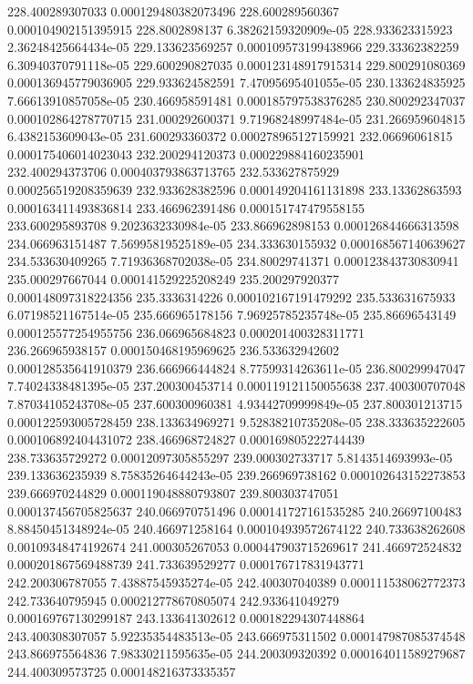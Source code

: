 {228.400289307033 0.000129480382073496
228.600289560367 0.000104902151395915
228.8002898137 6.38262159320909e-05
228.933623315923 2.36248425664434e-05
229.133623569257 0.000109573199438966
229.33362382259 6.30940370791118e-05
229.600290827035 0.000123148917915314
229.800291080369 0.000136945779036905
229.933624582591 7.47095695401055e-05
230.133624835925 7.66613910857058e-05
230.466958591481 0.000185797538376285
230.800292347037 0.000102864278770715
231.000292600371 9.71968248997484e-05
231.266959604815 6.4382153609043e-05
231.600293360372 0.000278965127159921
232.06696061815 0.000175406014023043
232.200294120373 0.000229884160235901
232.400294373706 0.000403793863713765
232.533627875929 0.000256519208359639
232.933628382596 0.000149204161131898
233.13362863593 0.000163411493836814
233.466962391486 0.000151747479558155
233.600295893708 9.2023632330984e-05
233.866962898153 0.000126844666313598
234.066963151487 7.56995819525189e-05
234.333630155932 0.000168567140639627
234.533630409265 7.71936368702038e-05
234.80029741371 0.000123843730830941
235.000297667044 0.000141529225208249
235.200297920377 0.000148097318224356
235.3336314226 0.000102167191479292
235.533631675933 6.07198521167514e-05
235.666965178156 7.96925785235748e-05
235.86696543149 0.000125577254955756
236.066965684823 0.000201400328311771
236.266965938157 0.000150468195969625
236.533632942602 0.000128535641910379
236.666966444824 8.77599314263611e-05
236.800299947047 7.74024338481395e-05
237.200300453714 0.000119121150055638
237.400300707048 7.87034105243708e-05
237.600300960381 4.93442709999849e-05
237.800301213715 0.000122593005728459
238.133634969271 9.52838210735208e-05
238.333635222605 0.000106892404431072
238.466968724827 0.000169805222744439
238.733635729272 0.00012097305855297
239.000302733717 5.8143514693993e-05
239.133636235939 8.75835264644243e-05
239.266969738162 0.000102643152273853
239.666970244829 0.000119048880793807
239.800303747051 0.000137456705825637
240.066970751496 0.000141727161535285
240.26697100483 8.88450451348924e-05
240.466971258164 0.000104939572674122
240.733638262608 0.00109348474192674
241.000305267053 0.000447903715269617
241.466972524832 0.000201867569488739
241.733639529277 0.000176717831943771
242.200306787055 7.43887545935274e-05
242.400307040389 0.000111538062772373
242.733640795945 0.000212778670805074
242.933641049279 0.000169767130299187
243.133641302612 0.000182294307448864
243.400308307057 5.92235354483513e-05
243.666975311502 0.000147987085374548
243.866975564836 7.98330211595635e-05
244.200309320392 0.000164011589279687
244.400309573725 0.000148216373335357
}
